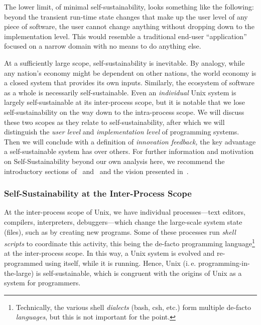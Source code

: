 \documentclass[ twoside,openright,titlepage,numbers=noenddot,headinclude,footinclude,cleardoublepage=empty,abstract=on,
                BCOR=5mm,paper=a4,fontsize=11pt
                ]{scrreprt}
\newcommand{\ie}{i.\,e.}
\theoremstyle{definition}
\begin{document}
The lower limit, of minimal self-sustainability, looks something like
the following: beyond the transient run-time state changes that make up
the user level of any piece of software, the user cannot change anything
without dropping down to the implementation level. This would resemble a
traditional end-user ``application'' focused on a narrow domain with no
means to do anything else.

At a sufficiently large scope, self-sustainability is inevitable. By
analogy, while any nation's economy might be dependent on other nations,
the world economy is a closed system that provides its own inputs.
Similarly, the ecosystem of software as a whole is necessarily
self-sustainable. Even an \emph{individual} Unix system is largely
self-sustainable at its inter-process scope, but it is notable that we
lose self-sustainability on the way down to the intra-process scope. We
will discuss these two scopes as they relate to self-sustainability,
after which we will distinguish the \emph{user level} and
\emph{implementation level} of programming systems. Then we will
conclude with a definition of \emph{innovation feedback,} the key
advantage a self-sustainable system has over others. For further
information and motivation on Self-Sustainability beyond our own
analysis here, we recommend the introductory sections
of~\parencite{COLAs} and~\parencite{OROM} and the vision presented
in~\parencite{CookClay}.

\hypertarget{self-sustainability-at-the-inter-process-scope}{\subsubsection{Self-Sustainability at the Inter-Process
Scope}\label{self-sustainability-at-the-inter-process-scope}}

At the inter-process scope of Unix, we have individual processes---text
editors, compilers, interpreters, debuggers---which change the
large-scale system state (files), such as by creating new programs. Some
of these processes run \emph{shell scripts} to coordinate this activity,
this being the de-facto programming language\footnote{Technically, the
  various shell \emph{dialects} (bash, csh, etc.) form multiple de-facto
  \emph{languages}, but this is not important for the point.} at the
inter-process scope. In this way, a Unix system is evolved and
re-programmed using itself, while it is running. Hence, Unix (\ie{}
programming-in-the-large) is self-sustainable, which is congruent with
the origins of Unix as a system for programmers.
\end{document}
